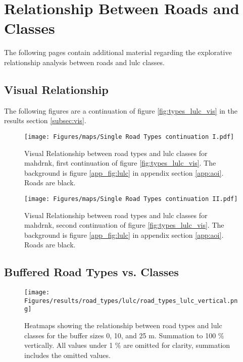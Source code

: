 \section{Relationship Between Roads and  Classes}

The following pages contain additional material regarding the explorative relationship analysis between roads and \gls{lulc} classes.

\subsection{Visual Relationship}
\label{app:vis_lulc}

The following figures are a continuation of figure \ref{fig:types_lulc_vis} in the results section \ref{subsec:vis}.

\begin{figure}[!htb]
    \centering
    \texttt{[image: Figures/maps/Single Road Types continuation I.pdf]}
    \caption[Visual Relationship between Road Types and  Classes, Continuation I]{Visual Relationship between road types and \gls{lulc} classes for \gls{mahdrnk}, first continuation of figure \ref{fig:types_lulc_vis}. The background is figure \ref{app_fig:lulc} in appendix section \ref{app:aoi}. Roads are black.}
    \label{app_fig:types_lulc_vis_maj}
\end{figure}

\begin{figure}[!htb]
    \centering
    \texttt{[image: Figures/maps/Single Road Types continuation II.pdf]}
    \caption[Visual Relationship between Road Types and  Classes, Continuation II]{Visual Relationship between road types and \gls{lulc} classes for \gls{mahdrnk}, second continuation of figure \ref{fig:types_lulc_vis}. The background is figure \ref{app_fig:lulc} in appendix section \ref{app:aoi}. Roads are black.}
    \label{app_fig:types_lulc_vis_min}
\end{figure}

\clearpage 

\subsection{Buffered Road Types vs.  Classes}
\label{app:road_types}

\begin{figure}[!htb]
    \centering
    \texttt{[image: Figures/results/road\_types/lulc/road\_types\_lulc\_vertical.png]}
    \caption[Heatmaps of Road Types vs.  Classes, Vertical Summation]{Heatmaps showing the relationship between road types and \gls{lulc} classes for the buffer sizes 0, 10, and 25 m. Summation to 100 \% vertically. All values under 1 \% are omitted for clarity, summation includes the omitted values.}
    \label{app_fig:types_lulc_v}
\end{figure}

